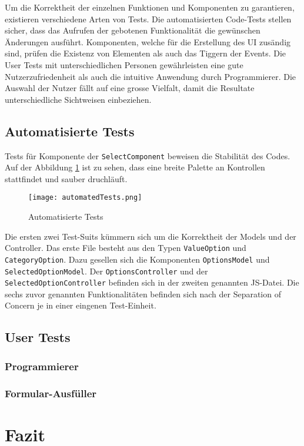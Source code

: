 Um die Korrektheit der einzelnen Funktionen und Komponenten zu garantieren, existieren verschiedene Arten von Tests.
Die automatisierten Code-Tests stellen sicher, dass das Aufrufen der gebotenen Funktionalität die gewünschen Änderungen ausführt.
Komponenten, welche für die Erstellung des UI zusändig sind, prüfen die Existenz von Elementen als auch das Tiggern der Events.
Die User Tests mit unterschiedlichen Personen gewährleisten eine gute Nutzerzufriedenheit als auch die intuitive Anwendung durch Programmierer.
Die Auswahl der Nutzer fällt auf eine grosse Vielfalt, damit die Resultate unterschiedliche Sichtweisen einbeziehen. 


\subsection{Automatisierte Tests}
\label{sec:automatedTests}

Tests für Komponente der \texttt{SelectComponent} beweisen die Stabilität des Codes.
Auf der Abbildung \ref{img:automatedTests} ist zu sehen, dass eine breite Palette an Kontrollen stattfindet und sauber druchläuft. 

\begin{figure}[!htb]
    \centering
    \texttt{[image: automatedTests.png]}
    \caption{Automatisierte Tests}
    \label{img:automatedTests}
\end{figure}

Die ersten zwei Test-Suits kümmern sich um die Korrektheit der Models und der Controller. 
Das erste File besteht aus den Typen \texttt{ValueOption} und \texttt{CategoryOption}. 
Dazu gesellen sich die Komponenten \texttt{OptionsModel} und \texttt{SelectedOptionModel}.
Der \texttt{OptionsController} und der \texttt{SelectedOptionController} befinden sich in der zweiten genannten JS-Datei.
Die sechs zuvor genannten Funktionalitäten befinden sich nach der Separation of Concern je in einer eingenen Test-Einheit.


\subsection{User Tests} %
\label{sec:userTests}


\subsubsection{Programmierer}
\label{sec:userTestsProgrammer}


\subsubsection{Formular-Ausfüller}
\label{sec:userTestsEnduser}



\section{Fazit}
\label{sec:summeryNew}

